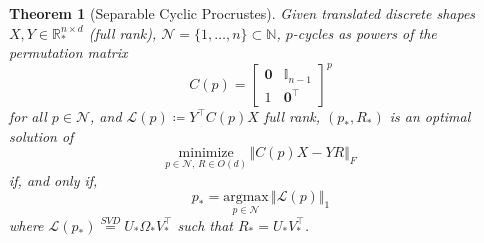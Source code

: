 \documentclass[pdflatex,iicol]{sn-jnl}%
\theoremstyle{thmstyleone}%
\newtheorem{theorem}{Theorem}%
\theoremstyle{thmstyletwo}%
\theoremstyle{thmstylethree}%
\begin{document}
\begin{theorem}[Separable Cyclic Procrustes]\label{thm:cycl_Procrustes}
    Given translated discrete shapes $X,Y \in \mathbb{R}^{n\times d}_*$ (full rank), $\mathcal{N} = \lbrace 1,\dots,n\rbrace \subset \mathbb{N}$, $p$-cycles as powers of the permutation matrix
    $$
    C(p) = \begin{bmatrix}
      \boldsymbol{0}& \mathbb{I}_{n-1} \\
     1 &\boldsymbol{0}^{\top}
    \end{bmatrix}^p
    $$ for all $p\in\mathcal{N}$, and $\mathcal{L}(p) \coloneqq Y^{\top}C(p)X$ full rank, $(p_*, R_*)$ is an optimal solution of
    $$
    \underset{p \in \mathcal{N},\, R \in O(d)}{\text{minimize}}\,\Vert C(p)X - YR\Vert_{F}
    $$
    if, and only if,
    $$
    p_* = \underset{p\in \mathcal{N}}{\text{argmax}} \,\Vert \mathcal{L}(p) \Vert_1
    $$ 
    where $\mathcal{L}({p_*}) \overset{SVD}{=} U_{*}\Omega_{*}V_{*}^{\top}$ such that $R_* = U_{*}V^{\top}_{*}$.
\end{theorem}
\end{document}
